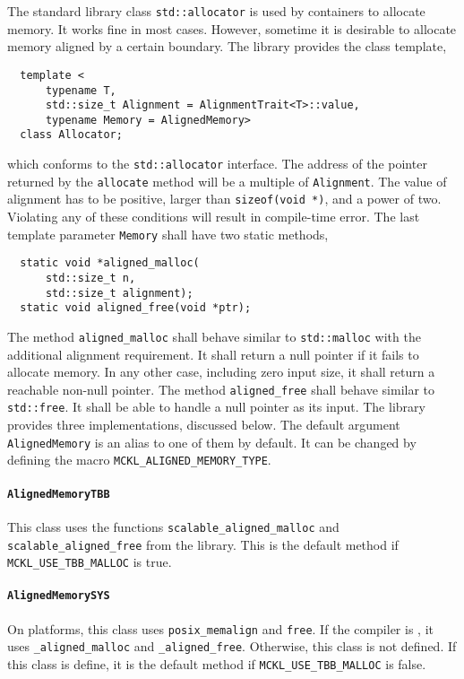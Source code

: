 The standard library class \verb|std::allocator| is used by containers to
allocate memory. It works fine in most cases. However, sometime it is desirable
to allocate memory aligned by a certain boundary. The library provides the
class template,
\begin{Verbatim}
  template <
      typename T,
      std::size_t Alignment = AlignmentTrait<T>::value,
      typename Memory = AlignedMemory>
  class Allocator;
\end{Verbatim}
which conforms to the \verb|std::allocator| interface. The address of the
pointer returned by the \verb|allocate| method will be a multiple of
\verb|Alignment|. The value of alignment has to be positive, larger than
\verb|sizeof(void *)|, and a power of two. Violating any of these conditions
will result in compile-time error. The last template parameter \verb|Memory|
shall have two static methods,
\begin{Verbatim}
  static void *aligned_malloc(
      std::size_t n,
      std::size_t alignment);
  static void aligned_free(void *ptr);
\end{Verbatim}
The method \verb|aligned_malloc| shall behave similar to \verb|std::malloc|
with the additional alignment requirement. It shall return a null pointer if it
fails to allocate memory. In any other case, including zero input size, it
shall return a reachable non-null pointer. The method \verb|aligned_free| shall
behave similar to \verb|std::free|. It shall be able to handle a null pointer
as its input. The library provides three implementations, discussed below. The
default argument \verb|AlignedMemory| is an alias to one of them by default. It
can be changed by defining the macro \verb|MCKL_ALIGNED_MEMORY_TYPE|.

\paragraph{\texttt{AlignedMemoryTBB}} This class uses the functions
\verb|scalable_aligned_malloc| and \verb|scalable_aligned_free| from the \tbb
library.
This is the default method if \verb|MCKL_USE_TBB_MALLOC| is true.

\paragraph{\texttt{AlignedMemorySYS}} On \posix platforms, this class uses
\verb|posix_memalign| and \verb|free|. If the compiler is \msvc, it uses
\verb|_aligned_malloc| and \verb|_aligned_free|. Otherwise, this class is not
defined. If this class is define, it is the default method if
\verb|MCKL_USE_TBB_MALLOC| is false.

